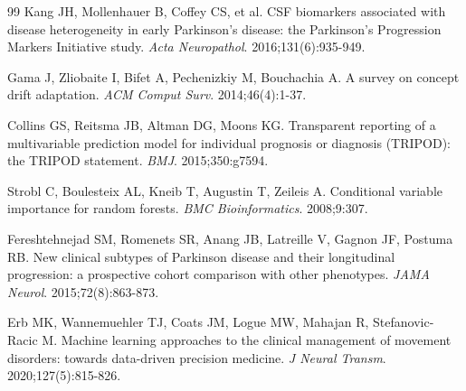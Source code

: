\documentclass[12pt,a4paper]{article}
\begin{document}
\begin{thebibliography}{99}
Kang JH, Mollenhauer B, Coffey CS, et al. CSF biomarkers associated with disease heterogeneity in early Parkinson's disease: the Parkinson's Progression Markers Initiative study. \textit{Acta Neuropathol}. 2016;131(6):935-949.

Gama J, Zliobaite I, Bifet A, Pechenizkiy M, Bouchachia A. A survey on concept drift adaptation. \textit{ACM Comput Surv}. 2014;46(4):1-37.

Collins GS, Reitsma JB, Altman DG, Moons KG. Transparent reporting of a multivariable prediction model for individual prognosis or diagnosis (TRIPOD): the TRIPOD statement. \textit{BMJ}. 2015;350:g7594.

Strobl C, Boulesteix AL, Kneib T, Augustin T, Zeileis A. Conditional variable importance for random forests. \textit{BMC Bioinformatics}. 2008;9:307.

Fereshtehnejad SM, Romenets SR, Anang JB, Latreille V, Gagnon JF, Postuma RB. New clinical subtypes of Parkinson disease and their longitudinal progression: a prospective cohort comparison with other phenotypes. \textit{JAMA Neurol}. 2015;72(8):863-873.

Erb MK, Wannemuehler TJ, Coats JM, Logue MW, Mahajan R, Stefanovic-Racic M. Machine learning approaches to the clinical management of movement disorders: towards data-driven precision medicine. \textit{J Neural Transm}. 2020;127(5):815-826.

\end{thebibliography}
\end{document}
